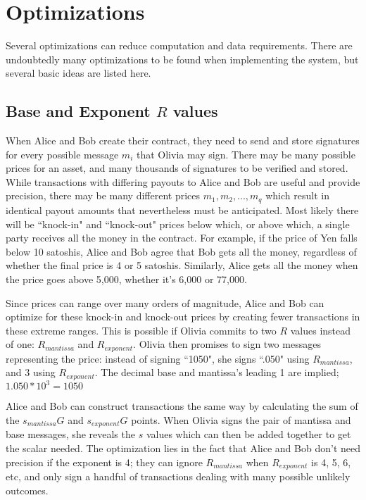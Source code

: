 \documentclass[11pt]{article}
\begin{document}
\section*{Optimizations}

Several optimizations can reduce computation and data requirements.  There are undoubtedly many optimizations to be found when implementing the system, but several basic ideas are listed here.

\subsection*{Base and Exponent \(R\) values}

When Alice and Bob create their contract, they need to send and store signatures for every possible message \(m_i\) that Olivia may sign.  There may be many possible prices for an asset, and many thousands of signatures to be verified and stored.  While transactions with differing payouts to Alice and Bob are useful and provide precision, there may be many different prices \(m_1,m_2,...,m_q\) which result in identical payout amounts that nevertheless must be anticipated.  Most likely there will be ``knock-in" and ``knock-out" prices below which, or above which, a single party receives all the money in the contract.  For example, if the price of Yen falls below 10 satoshis, Alice and Bob agree that Bob gets all the money, regardless of whether the final price is 4 or 5 satoshis.  Similarly, Alice gets all the money when the price goes above 5,000, whether it's 6,000 or 77,000.  

Since prices can range over many orders of magnitude, Alice and Bob can optimize for these knock-in and knock-out prices by creating fewer transactions in these extreme ranges.  This is possible if Olivia commits to two \(R\) values instead of one: \(R_{mantissa}\) and \(R_{exponent}\).  Olivia then promises to sign two messages representing the price: instead of signing ``1050", she signs ``.050" using  \(R_{mantissa}\), and \(3\) using \(R_{exponent}\).  The decimal base and mantissa's leading 1 are implied; \(1.050 * 10^3 = 1050\)


Alice and Bob can construct transactions the same way by calculating the sum of the \(s_{mantissa}G\) and \(s_{exponent}G\) points.  When Olivia signs the pair of mantissa and base messages, she reveals the \(s\) values which can then be added together to get the scalar needed.
The optimization lies in the fact that Alice and Bob don't need precision if the exponent is 4; they can ignore  \(R_{mantissa}\) when \(R_{exponent}\) is 4, 5, 6, etc, and only sign a handful of transactions dealing with many possible unlikely outcomes.
\end{document}
